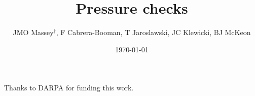 \documentclass[aspectratio=169,9pt]{beamer}
\title{Pressure checks}
\author{JMO Massey$^{\dag}$, F Cabrera-Booman, T Jaroslawski, JC Klewicki, BJ McKeon}
\institute{Center for Turbulence Research \\ Stanford University}
\date{\today}
\begin{document}
\begin{frame}
    \setcounter{framenumber}{0}
    \titlepage
    \vfill
    {\scriptsize \centering Thanks to DARPA for funding this work.\par}
\end{frame}

\end{document}
